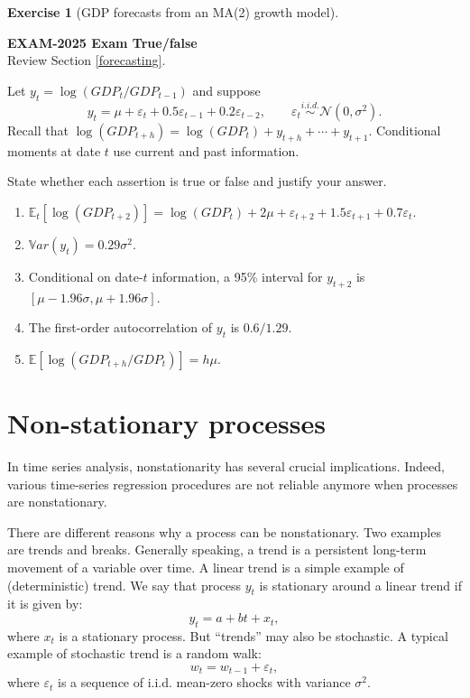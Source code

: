 \documentclass[
  11pt,
]{book}
\providecommand{\tightlist}{%
  \setlength{\itemsep}{0pt}\setlength{\parskip}{0pt}}
\theoremstyle{definition}
\theoremstyle{definition}
\theoremstyle{definition}
\newtheorem{exercise}{Exercise}[chapter]
\theoremstyle{definition}
\theoremstyle{remark}
\begin{document}
\begin{exercisebox}

\begin{exercise}[GDP forecasts from an MA(2) growth model]
\protect\hypertarget{exr:ex-exam2025-ma2-gdp-forecasting}{}\label{exr:ex-exam2025-ma2-gdp-forecasting}

\textbf{EXAM-2025 \textbar{} Exam \textbar{} True/false}\\
Review Section \ref{forecasting}.

Let \(y_t=\log(GDP_t/GDP_{t-1})\) and suppose
\[
y_t=\mu+\varepsilon_t+0.5\varepsilon_{t-1}+0.2\varepsilon_{t-2},
\qquad
\varepsilon_t\overset{i.i.d.}{\sim}\mathcal N(0,\sigma^2).
\]
Recall that \(\log(GDP_{t+h})=\log(GDP_t)+y_{t+h}+\cdots+y_{t+1}\). Conditional moments at date \(t\) use current and past information.

State whether each assertion is true or false and justify your answer.

\begin{enumerate}
\def\labelenumi{\arabic{enumi}.}
\tightlist
\item
  \(\mathbb E_t[\log(GDP_{t+2})]=\log(GDP_t)+2\mu+\varepsilon_{t+2}+1.5\varepsilon_{t+1}+0.7\varepsilon_t\).
\item
  \(\mathbb{V}ar(y_t)=0.29\sigma^2\).
\item
  Conditional on date-\(t\) information, a 95\% interval for \(y_{t+2}\) is \([\mu-1.96\sigma,\mu+1.96\sigma]\).
\item
  The first-order autocorrelation of \(y_t\) is \(0.6/1.29\).
\item
  \(\mathbb E[\log(GDP_{t+h}/GDP_t)]=h\mu\).
\end{enumerate}

\end{exercise}

\end{exercisebox}

\chapter{Non-stationary processes}\label{NonStat}

In time series analysis, nonstationarity has several crucial implications. Indeed, various time-series regression procedures are not reliable anymore when processes are nonstationary.

There are different reasons why a process can be nonstationary. Two examples are trends and breaks. Generally speaking, a trend is a persistent long-term movement of a variable over time. A linear trend is a simple example of (deterministic) trend. We say that process \(y_t\) is stationary around a linear trend if it is given by:
\[
y_t = a + bt + x_t,
\]
where \(x_t\) is a stationary process. But ``trends'' may also be stochastic. A typical example of stochastic trend is a random walk:
\[
w_t = w_{t-1} + \varepsilon_t,
\]
where \(\varepsilon_t\) is a sequence of i.i.d. mean-zero shocks with variance \(\sigma^2\).
\end{document}
